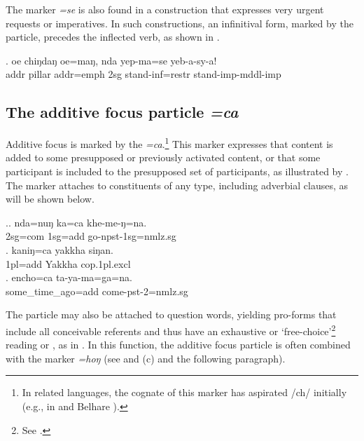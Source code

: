  The marker \emph{=se} is also found in a construction that expresses very urgent requests or imperatives. In such constructions, an infinitival form, marked by the  particle, precedes the inflected verb, as shown in \Next.

 \exg. oe     chiŋdaŋ            oe=maŋ,       nda yep-ma=se               yeb-a-sy-a!\\
 {\sc addr} pillar {\sc addr=emph} {\sc 2sg} stand{\sc -inf=restr} stand{\sc -imp-mddl-imp}\\
  
 
 
\subsection{The additive focus particle \emph{=ca}}\label{ptcl-additive}

 Additive focus is marked by the  \emph{=ca}.\footnote{In related languages, the cognate of this marker has aspirated /ch/ initially (e.g., in   and Belhare \citealt{Doornenbal2009A-grammar, Bickel2003Belhare}).} This marker expresses that content is added to some presupposed or previously activated  content, or that some participant is included to the presupposed set of participants, as illustrated by \Next. The marker attaches  to constituents of any type, including adverbial clauses, as will be shown below. 
\largerpage
 
 \ex.\ag. nda=nuŋ ka=ca khe-me-ŋ=na.\\
 {\sc 2sg=com}  {\sc 1sg=add}  go{\sc -npst-1sg=nmlz.sg}\\
 \bg.             kaniŋ=ca        yakkha          siŋan.\\
 {\sc 1pl=add} Yakkha {\sc cop.1pl.excl}\\
  
\bg.  encho=ca                ta-ya-ma=ga=na.\\
some\_time\_ago{\sc =add} come{\sc -pst-2=nmlz.sg}\\
 
 
The  particle  may also  be attached to question words,  yielding pro-forms that include all conceivable referents and thus have an exhaustive or ‘free-choice’\footnote{See \citet[980]{Koenig1993_Focus}.}  reading  or ,  as in \Next. In this function, the additive focus particle is often combined with the  marker \emph{=hoŋ} (see \Next[b] and (c) and the following paragraph). 

